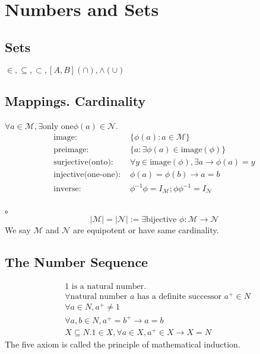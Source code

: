 \section{Numbers and Sets}

\subsection{Sets}

\begin{Sym}
    $\in, \subseteq, \subset, [A,B](\cap), \wedge(\cup)$
\end{Sym}

\subsection{Mappings. Cardinality}

\begin{Def}[Function]
    $\forall a\in \mathcal{M},\exists \text{only one} \phi(a)\in \mathcal{N}$.
    \begin{align*}
        \text{image: } & \{\phi(a): a\in \mathcal{M}\}  \\
        \text{preimage: } & \{a: \exists \phi(a) \in \text{image}(\phi)\}   \\
        \text{surjective(onto): } & \forall y \in \text{image}(\phi), \exists a \rightarrow \phi(a)=y   \\
        \text{injective(one-one): } & \phi(a) = \phi(b) \rightarrow a = b   \\
        \text{inverse: } & \phi^{-1}\phi=I_\mathcal{M}; \phi\phi^{-1}=I_\mathcal{N}
    \end{align*}
\end{Def}

\begin{Them}[Bernstein]。
    \[
        |\mathcal{M}|=|\mathcal{N}|:= \exists \text{bijective } \phi: \mathcal{M}\rightarrow \mathcal{N}
    \]
    We say $\mathcal{M}$ and $\mathcal{N}$ are equipotent or have same cardinality.
\end{Them}

\subsection{The Number Sequence}

\begin{Axm}[Peano]
    \begin{align*}
        &1 \text{ is a natural number.}  \\
        &\forall \text{natural number } a \text{ has a definite successor } a^+ \in N   \\
        &\forall a\in N, a^+ \neq 1 \\
        &\forall a,b\in N,a^+=b^+ \rightarrow a=b    \\
        &X\subseteq N. 1 \in X, \forall a \in X, a^+\in X \rightarrow X=N  
    \end{align*}
    The five axiom is called the principle of mathematical induction.
\end{Axm}

